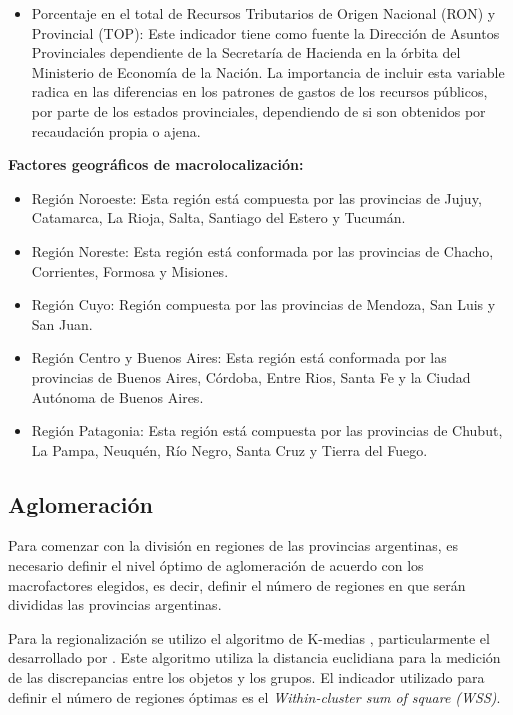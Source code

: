 \documentclass[12pt,a4paper]{article}
\begin{document}
\begin{itemize}
\item Porcentaje en el total de Recursos Tributarios de Origen Nacional (RON) y Provincial (TOP): Este indicador tiene como fuente la Dirección de Asuntos Provinciales dependiente de la Secretaría de Hacienda en la órbita del Ministerio de Economía de la Nación. La importancia de incluir esta variable radica en las diferencias en los patrones de gastos de los recursos públicos, por parte de los estados provinciales, dependiendo de si son obtenidos por recaudación propia o ajena.
\end{itemize}

\textbf{Factores geográficos de macrolocalización:}
\begin{itemize}
\item Región  Noroeste: Esta región está compuesta por las provincias de Jujuy, Catamarca, La Rioja, Salta, Santiago del Estero y Tucumán.
\item Región  Noreste: Esta región está conformada por las provincias de Chacho, Corrientes, Formosa y Misiones.
\item Región Cuyo: Región compuesta por las provincias de Mendoza, San Luis y San Juan.
\item Región Centro y Buenos Aires: Esta región está conformada por las provincias de Buenos Aires, Córdoba, Entre Rios, Santa Fe y la Ciudad Autónoma de Buenos Aires.
\item Región Patagonia: Esta región está compuesta por las provincias de Chubut, La Pampa, Neuquén, Río Negro, Santa Cruz y Tierra del Fuego.
\end{itemize}



\subsection{Aglomeración}

Para comenzar con la división en regiones de las provincias argentinas, es necesario definir el nivel óptimo de aglomeración de acuerdo con los macrofactores elegidos, es decir, definir el número de regiones en que serán divididas las provincias argentinas.

Para la regionalización se utilizo el algoritmo de K-medias \parencite{macqueen_methods_1967}, particularmente el desarrollado por \textcite{hartigan_k-means_1979}. Este algoritmo utiliza la distancia euclidiana para la medición de las discrepancias entre los objetos y los grupos. El indicador utilizado para definir el número de regiones óptimas es el \textit{Within-cluster sum of square (WSS)}.
\end{document}
